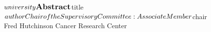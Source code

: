 \thispagestyle{empty}
\begin{center}
${university} \\
\vspace{1cm}
\large{\textbf{Abstract}} \\
\vspace{1cm}
${title} \\
\vspace{1cm}
${author} \\
\vspace{1cm}
Chair of the Supervisory Committee: \\
Associate Member ${chair} \\
Fred Hutchinson Cancer Research Center \\
\vspace{1cm}
\end{center}
\newpage

